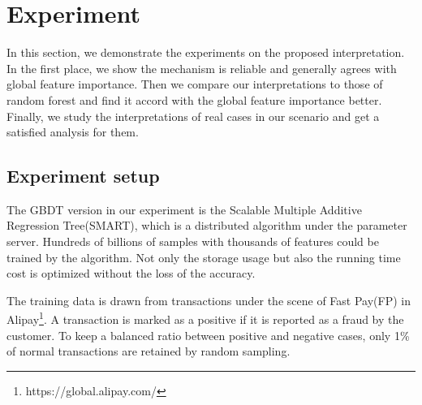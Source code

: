 \section{Experiment}\label{secexp}
In this section, we demonstrate the experiments on the proposed interpretation.
In the first place,  we show the mechanism is reliable and generally agrees with global 
feature importance. Then we compare our interpretations to those of random 
forest and find it accord with the global feature importance better. Finally, 
we study the interpretations of real cases in our scenario and get a satisfied
analysis for them.

\subsection{Experiment setup}
The GBDT version in our experiment is the Scalable Multiple 
Additive Regression Tree(SMART)\cite{zhou2017psmart}, which is a distributed algorithm under the parameter server. 
Hundreds of billions of samples with thousands of features could be trained by the algorithm.
Not only the storage usage but also the running time cost is optimized 
without the loss of the accuracy.  

The training data is drawn from 
transactions under the scene of Fast Pay(FP)
in Alipay\footnote{https://global.alipay.com/}. A transaction is marked as a positive if it is reported as a fraud by the customer.
To keep a balanced ratio between positive and negative cases, only 1\% of normal transactions  are retained
 by random sampling. 

